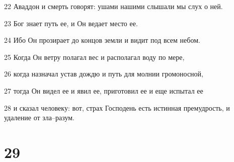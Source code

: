 \par 22 Аваддон и смерть говорят: ушами нашими слышали мы слух о ней.
\par 23 Бог знает путь ее, и Он ведает место ее.
\par 24 Ибо Он прозирает до концов земли и видит под всем небом.
\par 25 Когда Он ветру полагал вес и располагал воду по мере,
\par 26 когда назначал устав дождю и путь для молнии громоносной,
\par 27 тогда Он видел ее и явил ее, приготовил ее и еще испытал ее
\par 28 и сказал человеку: вот, страх Господень есть истинная премудрость, и удаление от зла--разум.

\chapter{29}


